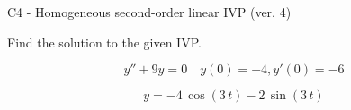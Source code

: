 \begin{exercise}
  \begin{exerciseTitle}C4 - Homogeneous second-order linear IVP (ver. 4)\end{exerciseTitle}
  \begin{exerciseStatement}
    
Find the solution to the given IVP.

    
\[y''+9y = 0 \hspace{1em} y(0) = -4 , y'(0) = -6\]

  \end{exerciseStatement}
  \begin{exerciseAnswer}
    
\[y= -4 \, \cos\left(3 \, t\right) - 2 \, \sin\left(3 \, t\right)\]

  \end{exerciseAnswer}
\end{exercise}